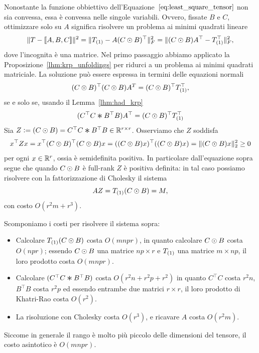 Nonostante la funzione obbiettivo dell'Equazione~$\eqref{eq:least_square_tensor}$ non sia convessa,
essa è convessa nelle singole variabili. Ovvero, fissate $ B $ e $ C $, ottimizzare solo su $ A $
significa risolvere un problema ai minimi quadrati lineare
\begin{equation}
	\label{eq:lsq_matrix}
	\| T - \dsqr{A,B,C}\|^2 = \| \Tm{T}{1} - A(C \krp B)^{\top}\|_F^2 = \| (C \krp B)A^{\top} -
	\Tm{T}{1}^{\top}\|_F^2,
\end{equation}
dove l'incognita è una matrice. Nel primo
passaggio abbiamo applicato la Proposizione~\ref{lhm:krp_unfoldings} per ridurci a un problema ai
minimi quadrati matriciale.
La soluzione può essere espressa in termini delle equazioni normali
\[
	(C \krp B)^{\top}(C \krp B)A^T = (C \krp B)^{\top}\Tm{T}{1}^{\top}
	,\]
se e solo se, usando il Lemma~\ref{lhm:had_krp}
\begin{equation}
	\label{eq:als_pseudoinverse_eq}
	(C^{\top}C \had B^{\top}B)A^{\top} = (C \krp B)^{\top}\Tm{T}{1}^{\top}
\end{equation}
Sia $ Z \defeq (C \krp B) = C^{\top}C \had B^{\top}B \in \R^{r\times r} $. Osserviamo che $ Z $ soddisfa
\begin{equation*}
	x^{\top}Zx = x^{\top}(C \mathbin{\odot} B)^{\top}(C \mathbin{\odot} B)x = ((C \mathbin{\odot} B)x)^{\top}((C \mathbin{\odot} B)x) = \| (C \mathbin{\odot}
	B)x \|_{2}^2 \ge 0
\end{equation*}
per ogni $ x \in \mathbb{R}^r $, ossia è semidefinita positiva. In particolare dall'equazione sopra segue che quando $ C
	\mathbin{\odot} B$ è full-rank $ Z $ è positiva definita: in tal caso possiamo risolvere con la fattorizzazione di Cholesky il sistema
\begin{equation}
	AZ = \Tm{T}{1}(C\krp B)= M,
\end{equation}
con costo $ O(r^2m + r^3) $.

\begin{remark}
	Scomponiamo i costi per risolvere il sistema sopra:
	\begin{itemize}
		\item Calcolare $ \Tm{T}{1}(C \krp B) $ costa $ O(mnpr) $, in quanto calcolare $ C \mathbin{\odot} B $
		      costa $ O(npr) $; essendo $ C \mathbin{\odot} B $ una matrice $ np \times r $ e $ \Tm{T}{1} $ una matrice
		      $ m \times np $, il loro prodotto costa $ O(mnpr) $.
		\item Calcolare $ (C^{\top}C \had B^{\top}B) $ costa $ O(r^2n + r^2 p + r^2) $ in quanto $
			      C^{\top}C $ costa $ r^2n $, $ B^{\top}B $ costa $ r^2p $ ed essendo entrambe due matrici $ r
			      \times r $, il loro prodotto di Khatri-Rao costa $ O(r^2) $.
		\item La risoluzione con Cholesky costa $ O(r^3) $, e ricavare $ A $ costa $ O(r^2m) $.
	\end{itemize}
	Siccome in generale il rango è molto più piccolo delle dimensioni del tensore, il costo asintotico è $ O(mnpr) $.
\end{remark}

